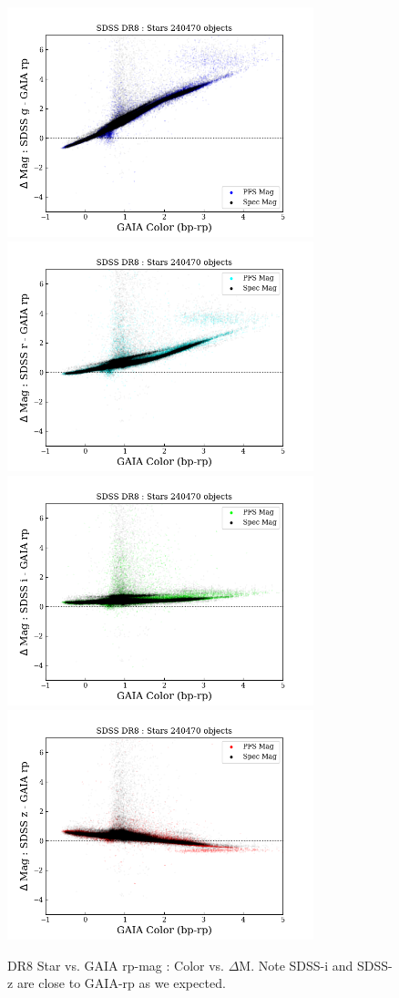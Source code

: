 \documentclass[apj,twocolumn]{aastex631}
\begin{document}
\begin{figure}%
\begin{center}
\includegraphics[angle=0,width=8.9cm]{figures/20220812_color_dmag_g_rp_dr8star.png}
\includegraphics[angle=0,width=8.9cm]{figures/20220812_color_dmag_r_rp_dr8star.png}
\includegraphics[angle=0,width=8.9cm]{figures/20220812_color_dmag_i_rp_dr8star.png}
\includegraphics[angle=0,width=8.9cm]{figures/20220812_color_dmag_z_rp_dr8star.png}
\caption{DR8 Star vs. GAIA rp-mag : Color vs. $\Delta$M.  Note SDSS-i and SDSS-z are close to GAIA-rp as we expected.}
\end{center}
\end{figure}
\end{document}

